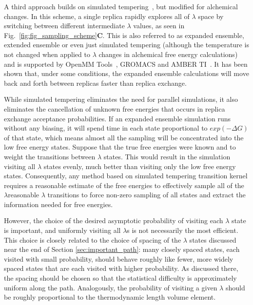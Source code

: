 \documentclass[9pt,bestpractices]{livecoms}
\begin{document}
A third approach builds on simulated tempering~\cite{marinari1992simulated}, but modified for alchemical changes. In this scheme, a single replica rapidly explores all of $\lambda$ space by switching between different intermediate $\lambda$ values, as seen in Fig.~\ref{fig:fig_sampling_scheme}\textbf{C}. This is also referred to as expanded ensemble, extended ensemble or even just simulated tempering (although the temperature is not changed when applied to $\lambda$ changes in alchemical free energy calculations) ~\cite{lyubartsev1992new, li2007simulated, tan2017optimally} and is supported by OpenMM Tools~\cite{andrearizzi2019choderalab}, GROMACS and AMBER TI~\cite{Lee_JPhysChemB_2025_v129_p13063}.   It has been shown that, under some conditions, the expanded ensemble calculations will move back and forth between replicas faster than replica exchange.~\cite{zhang2008comparison,hsu2024replica}  

While simulated tempering eliminates the need for parallel simulations, it also eliminates the cancellation of unknown free energies that occurs in replica exchange acceptance probabilities. If an expanded ensemble simulation runs without any biasing, it will spend time in each state proportional to $exp(-\Delta G)$ of that state, which means almost all the sampling will be concentrated into the low free energy states.  
Suppose that the true free energies were known and to weight the transitions between $\lambda$ states.  This would result in the simulation visiting all $\lambda$ states evenly, much better than visiting only the low free energy states.  Consequently, any method based on simulated tempering transition kernel requires a reasonable estimate of the free energies to effectively sample all of the $\lambda$reasonable $\lambda$ transitions to force non-zero sampling of all states and extract the information needed for free energies.

However, the choice of the desired asymptotic probability of visiting each $\lambda$ state is important, and uniformly visiting all $\lambda$s is not necessarily the most efficient. This choice is closely related to the choice of spacing of the $\lambda$ states discussed near the end of Section \ref{sec:important_path}: many closely spaced states, each visited with small probability, should behave roughly like fewer, more widely spaced states that are each visited with higher probability. As discussed there, the spacing should be chosen so that the statistical difficulty is approximately uniform along the path. Analogously, the probability of visiting a given $\lambda$ should be roughly proportional to the thermodynamic length volume element\cite{gelman1998simulating, martinez-veracoechea2008variance}.
\end{document}
